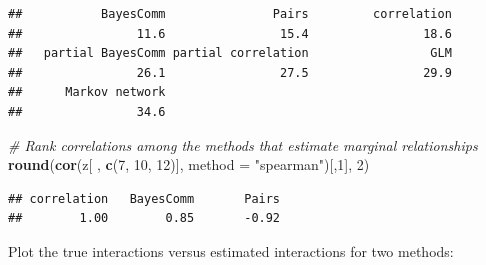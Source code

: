 \documentclass[11pt,]{article}
\newenvironment{Shaded}{\begin{snugshade}}{\end{snugshade}}
\newcommand{\KeywordTok}[1]{\textcolor[rgb]{0.13,0.29,0.53}{\textbf{{#1}}}}
\newcommand{\DataTypeTok}[1]{\textcolor[rgb]{0.13,0.29,0.53}{{#1}}}
\newcommand{\DecValTok}[1]{\textcolor[rgb]{0.00,0.00,0.81}{{#1}}}
\newcommand{\StringTok}[1]{\textcolor[rgb]{0.31,0.60,0.02}{{#1}}}
\newcommand{\CommentTok}[1]{\textcolor[rgb]{0.56,0.35,0.01}{\textit{{#1}}}}
\newcommand{\NormalTok}[1]{{#1}}
\begin{document}
\begin{verbatim}
##           BayesComm               Pairs         correlation 
##                11.6                15.4                18.6 
##   partial BayesComm partial correlation                 GLM 
##                26.1                27.5                29.9 
##      Markov network 
##                34.6
\end{verbatim}

\begin{Shaded}
\begin{Highlighting}[]
\CommentTok{# Rank correlations among the methods that estimate marginal relationships}
\KeywordTok{round}\NormalTok{(}\KeywordTok{cor}\NormalTok{(z[ , }\KeywordTok{c}\NormalTok{(}\DecValTok{7}\NormalTok{, }\DecValTok{10}\NormalTok{, }\DecValTok{12}\NormalTok{)], }\DataTypeTok{method =} \StringTok{"spearman"}\NormalTok{)[,}\DecValTok{1}\NormalTok{], }\DecValTok{2}\NormalTok{)}
\end{Highlighting}
\end{Shaded}

\begin{verbatim}
## correlation   BayesComm       Pairs 
##        1.00        0.85       -0.92
\end{verbatim}

Plot the true interactions versus estimated interactions for two
methods:
\end{document}
